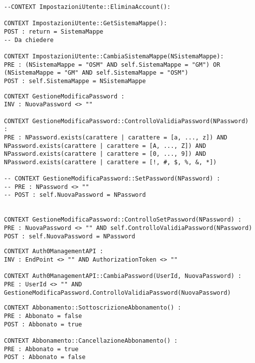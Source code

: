 \begin{listaPersonale}[OCL]{}
\begin{lstlisting}
--CONTEXT ImpostazioniUtente::EliminaAccount():

CONTEXT ImpostazioniUtente::GetSistemaMappe():
POST : return = SistemaMappe 
-- Da chiedere

CONTEXT ImpostazioniUtente::CambiaSistemaMappe(NSistemaMappe):
PRE : (NSistemaMappe = "OSM" AND self.SistemaMappe = "GM") OR (NSistemaMappe = "GM" AND self.SistemaMappe = "OSM")
POST : self.SistemaMappe = NSistemaMappe
    \end{lstlisting}




    \begin{lstlisting}
CONTEXT GestioneModificaPassword :
INV : NuovaPassword <> ""

CONTEXT GestioneModificaPassword::ControlloValidiaPassword(NPassword) :
PRE : NPassword.exists(carattere | carattere = [a, ..., z]) AND NPassword.exists(carattere | carattere = [A, ..., Z]) AND NPassword.exists(carattere | carattere = [0, ..., 9]) AND NPassword.exists(carattere | carattere = [!, #, $, %, &, *])

-- CONTEXT GestioneModificaPassword::SetPassword(NPassword) :
-- PRE : NPassword <> ""
-- POST : self.NuovaPassword = NPassword


CONTEXT GestioneModificaPassword::ControlloSetPassword(NPassword) :
PRE : NuovaPassword <> "" AND self.ControlloValidiaPassword(NPassword)
POST : self.NuovaPassword = NPassword
    \end{lstlisting}




    \begin{lstlisting}
CONTEXT Auth0ManagementAPI :
INV : EndPoint <> "" AND AuthorizationToken <> ""

CONTEXT Auth0ManagementAPI::CambiaPassword(UserId, NuovaPassword) :
PRE : UserId <> "" AND GestioneModificaPassword.ControlloValidiaPassword(NuovaPassword)
    \end{lstlisting}




    \begin{lstlisting}
CONTEXT Abbonamento::SottoscrizioneAbbonamento() :
PRE : Abbonato = false
POST : Abbonato = true

CONTEXT Abbonamento::CancellazioneAbbonamento() :
PRE : Abbonato = true
POST : Abbonato = false
    \end{lstlisting}





\end{listaPersonale}
